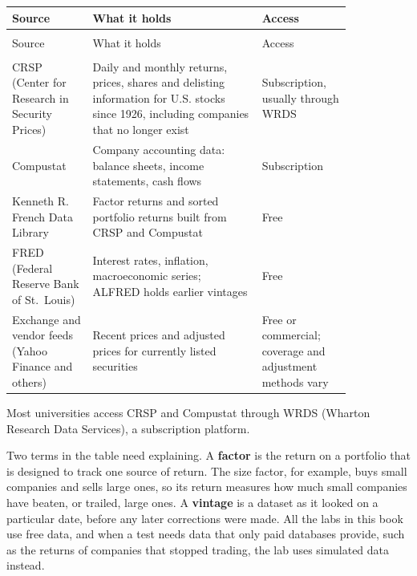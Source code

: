\begingroup
\small
\setlength{\LTpre}{6pt}\setlength{\LTpost}{6pt}
\begin{longtable}{@{}>{\raggedright\arraybackslash}p{0.2\linewidth}>{\raggedright\arraybackslash}p{0.42\linewidth}>{\raggedright\arraybackslash}p{0.22\linewidth}@{}}
\toprule
Source & What it holds & Access \\
\midrule
\endfirsthead
\multicolumn{3}{@{}l}{\emph{(continued)}}\\
\toprule
Source & What it holds & Access \\
\midrule
\endhead
\midrule
\multicolumn{3}{r@{}}{\emph{continued on next page}}\\
\endfoot
\bottomrule
\endlastfoot
CRSP (Center for Research in Security Prices) & Daily and monthly returns, prices, shares and delisting information for U.S. stocks since 1926, including companies that no longer exist & Subscription, usually through WRDS \\
Compustat & Company accounting data: balance sheets, income statements, cash flows & Subscription \\
Kenneth R. French Data Library & Factor returns and sorted portfolio returns built from CRSP and Compustat & Free \\
FRED (Federal Reserve Bank of St.\ Louis) & Interest rates, inflation, macroeconomic series; ALFRED holds earlier vintages & Free \\
Exchange and vendor feeds (Yahoo Finance and others) & Recent prices and adjusted prices for currently listed securities & Free or commercial; coverage and adjustment methods vary \\
\end{longtable}
\endgroup

Most universities access CRSP and Compustat through WRDS (Wharton Research Data Services), a subscription platform.

Two terms in the table need explaining. A \textbf{factor} is the return on a portfolio that is designed to track one source of return. The size factor, for example, buys small companies and sells large ones, so its return measures how much small companies have beaten, or trailed, large ones. A \textbf{vintage} is a dataset as it looked on a particular date, before any later corrections were made. All the labs in this book use free data, and when a test needs data that only paid databases provide, such as the returns of companies that stopped trading, the lab uses simulated data instead.

